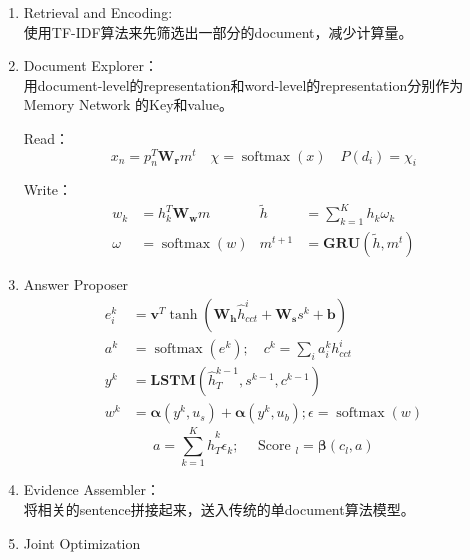 \documentclass[a4paper,UTF8]{article}
\numberwithin{equation}{section}
\begin{document}
\begin{enumerate}
	\item  Retrieval and Encoding:\\使用TF-IDF算法来先筛选出一部分的document，减少计算量。
	\item  Document Explorer：\\用document-level的representation和word-level的representation分别作为Memory Network
	的Key和value。

	Read：\begin{equation}
		x_{n}=p_{n}^{T} \mathbf{W}_{\mathbf{r}} m^{t} \quad \chi=\operatorname{softmax}(x) \quad P\left(d_{i}\right)=\chi_{i}
		\end{equation}
	
	Write：\begin{equation}
	\begin{array}{rlrl}{w_{k}} & {=h_{k}^{T} \mathbf{W}_{\mathbf{w}} m} & {\tilde{h}} & {=\sum_{k=1}^{K} h_{k} \omega_{k}} \\ {\omega} & {=\operatorname{softmax}(w)} & {m^{t+1}} & {=\mathbf{G} \mathbf{R} \mathbf{U}\left(\tilde{h}, m^{t}\right)}\end{array}
	\end{equation}
	\item  Answer Proposer
	\begin{equation}
	\begin{aligned} e_{i}^{k} &=\mathbf{v}^{T} \tanh \left(\mathbf{W}_{\mathbf{h}} \hat{h}_{c c t}^{i}+\mathbf{W}_{\mathbf{s}} s^{k}+\mathbf{b}\right) \\ a^{k} &=\operatorname{softmax}\left(e^{k}\right) ; \quad c^{k}=\sum_{i} a_{i}^{k} h_{c c t}^{i} \\ y^{k} &=\mathbf{L} \mathbf{S} \mathbf{T} \mathbf{M}\left(\hat{h}_{T}^{k-1}, s^{k-1}, c^{k-1}\right) \\ w^{k} &=\boldsymbol{\alpha}\left(y^{k}, u_{s}\right)+\boldsymbol{\alpha}\left(y^{k}, u_{b}\right) ; \epsilon=\operatorname{softmax}(w) \end{aligned}
	\end{equation}
	\begin{equation}
		a=\sum_{k=1}^{K} \hat{h}_{T}^{k} \epsilon_{k} ; \quad \text { Score }_{l}=\boldsymbol{\beta}\left(c_{l}, a\right)
		\end{equation}
	\item  Evidence Assembler：\\将相关的sentence拼接起来，送入传统的单document算法模型。
	\item  Joint Optimization
\end{enumerate}
\end{document}
